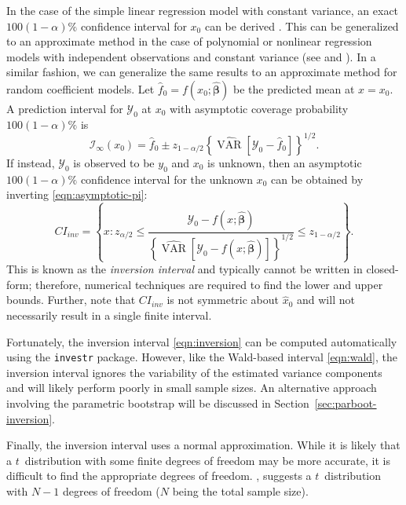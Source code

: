 \documentclass{article}\usepackage[]{graphicx}\usepackage[]{color}
\newcommand{\VAR}{\operatorname{VAR}}
\begin{document}
In the case of the simple linear regression model with constant variance, an exact $100(1-\alpha)\%$ confidence interval for $x_0$ can be derived \citep{graybill-theory-1976}.  This can be generalized to an approximate method in the case of polynomial or nonlinear regression models with independent observations and constant variance (see \citet{seber-nonlinear-2003} and \citet{huet-statistical-2004}).  In a similar fashion, we can generalize the same results to an approximate method for random coefficient models.  Let $\widehat{f}_0 = f\left(x_0; \widehat{\bm{\beta}}\right)$ be the predicted mean at $x = x_0$.  A prediction interval for $\mathcal{Y}_0$ at $x_0$ with asymptotic coverage probability $100(1-\alpha)\%$ is
\begin{equation}
\label{eqn:asymptotic-pi}
  \mathcal{I}_\infty\left(x_0\right) = \widehat{f}_0 \pm z_{1-\alpha/2}\left\{ \widehat{\VAR}\left[\mathcal{Y}_0 - \widehat{f}_0\right] \right\}^{1/2}.
\end{equation}
If instead, $\mathcal{Y}_0$ is observed to be $y_0$ and $x_0$ is unknown, then an asymptotic $100(1-\alpha)\%$ confidence interval for the unknown $x_0$ can be obtained by inverting \eqref{eqn:asymptotic-pi}:
\begin{equation}
\label{eqn:inversion}
  CI_{inv} = \left\{ x: z_{\alpha/2} \le \frac{\mathcal{Y}_0-f\left(x; \widehat{\bm{\beta}}\right)}{\left\{ \widehat{\VAR}\left[\mathcal{Y}_0 - f\left(x; \widehat{\bm{\beta}}\right)\right] \right\}^{1/2}} \le z_{1-\alpha/2} \right\}.
\end{equation}
This is known as the \emph{inversion interval} and typically cannot be written in closed-form; therefore, numerical techniques are required to find the lower and upper bounds.  Further, note that $CI_{inv}$ is not symmetric about $\widehat{x}_0$ and will not necessarily result in a single finite interval.

Fortunately, the inversion interval \eqref{eqn:inversion} can be computed automatically using the \texttt{investr} package.  However, like the Wald-based interval \eqref{eqn:wald}, the inversion interval ignores the variability of the estimated variance components and will likely perform poorly in small sample sizes.  An alternative approach involving the parametric bootstrap will be discussed in Section~\ref{sec:parboot-inversion}.

Finally, the inversion interval uses a normal approximation.  While it is likely that a $t$~distribution with some finite degrees of freedom may be more accurate, it is difficult to find the appropriate degrees of freedom. \citet{oman-calibration-1998}, suggests a $t$~distribution with $N-1$ degrees of freedom ($N$ being the total sample size).
\end{document}
